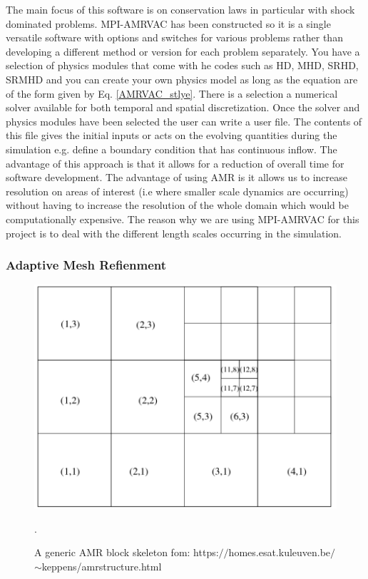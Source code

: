 \documentclass[12pt,a4paper,twoside]{article}
\begin{document}
The main focus of this software is on conservation laws in particular with shock dominated problems. MPI-AMRVAC has been constructed so it is a single versatile software with options and switches for various problems rather than developing a different method or version for each problem separately. You have a selection of physics modules that come with he codes such as HD, MHD, SRHD, SRMHD and you can create your own physics model as long as the equation are of the form given by Eq. \eqref{AMRVAC_stlye}. There is a selection a numerical solver available for both temporal and spatial discretization. Once the solver and physics modules have been selected the user can write a user file. The contents of this file gives the initial inputs or acts on the evolving quantities during the simulation e.g. define a boundary condition that has continuous inflow. The advantage of this approach is that it allows for a reduction of overall time for software development. The advantage of using AMR is it allows us to increase resolution on areas of interest (i.e where smaller scale dynamics are occurring) without having to increase the resolution of the whole domain which would be computationally expensive. The reason why we are using MPI-AMRVAC for this project is to deal with the different length scales occurring in the simulation.
\subsubsection{Adaptive Mesh Refienment}
\begin{figure}
\centering
\includegraphics[width = \textwidth]{amrpng.png}
\caption{A generic AMR block skeleton fom: https:$//$homes.esat.kuleuven.be$/$ $\sim$keppens/amrstructure.html}.
\label{amr_scheme}
\end{figure}   
\end{document}
